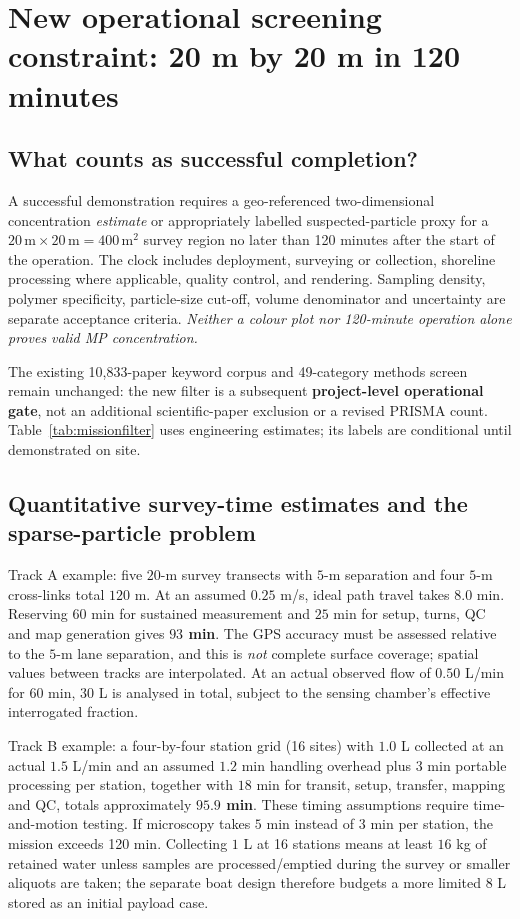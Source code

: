 \documentclass[10pt,a4paper]{article}
\begin{document}
\clearpage
\section{New operational screening constraint: 20 m by 20 m in 120 minutes}\label{sec:mission2h}
\subsection{What counts as successful completion?}
A successful demonstration requires a geo-referenced two-dimensional concentration \emph{estimate} or appropriately labelled suspected-particle proxy for a $20\,\mathrm{m}\times20\,\mathrm{m}=400\,\mathrm{m^2}$ survey region no later than 120 minutes after the start of the operation. The clock includes deployment, surveying or collection, shoreline processing where applicable, quality control, and rendering. Sampling density, polymer specificity, particle-size cut-off, volume denominator and uncertainty are separate acceptance criteria. \emph{Neither a colour plot nor 120-minute operation alone proves valid MP concentration.}

The existing 10,833-paper keyword corpus and 49-category methods screen remain unchanged: the new filter is a subsequent \textbf{project-level operational gate}, not an additional scientific-paper exclusion or a revised PRISMA count. Table~\ref{tab:missionfilter} uses engineering estimates; its labels are conditional until demonstrated on site.

\subsection{Quantitative survey-time estimates and the sparse-particle problem}
Track A example: five $20$-m survey transects with $5$-m separation and four $5$-m cross-links total $120$ m. At an assumed $0.25$ m/s, ideal path travel takes $8.0$ min. Reserving $60$ min for sustained measurement and $25$ min for setup, turns, QC and map generation gives \textbf{$93$ min}. The GPS accuracy must be assessed relative to the $5$-m lane separation, and this is \emph{not} complete surface coverage; spatial values between tracks are interpolated. At an actual observed flow of $0.50$ L/min for 60 min, $30$ L is analysed in total, subject to the sensing chamber's effective interrogated fraction.

Track B example: a four-by-four station grid (16 sites) with $1.0$ L collected at an actual $1.5$ L/min and an assumed $1.2$ min handling overhead plus $3$ min portable processing per station, together with $18$ min for transit, setup, transfer, mapping and QC, totals approximately \textbf{$95.9$ min}. These timing assumptions require time-and-motion testing. If microscopy takes $5$ min instead of $3$ min per station, the mission exceeds 120 min. Collecting $1$ L at 16 stations means at least $16$ kg of retained water unless samples are processed/emptied during the survey or smaller aliquots are taken; the separate boat design therefore budgets a more limited $8$ L stored as an initial payload case.
\end{document}
